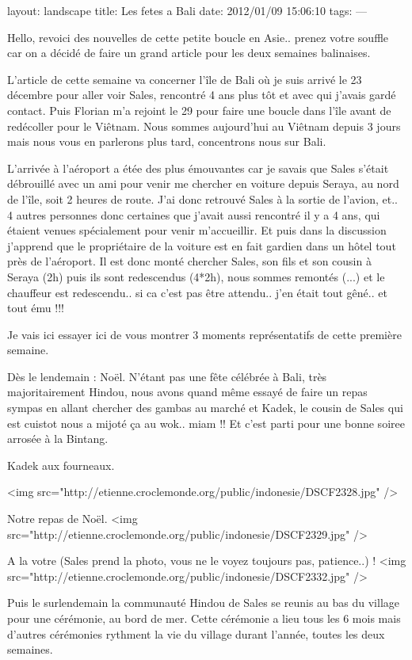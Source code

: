 layout: landscape
title: Les fetes a Bali
date: 2012/01/09 15:06:10
tags:
---

Hello, revoici des nouvelles de cette petite boucle en Asie.. prenez votre souffle car on a décidé de faire un grand article pour les deux semaines balinaises.

L'article de cette semaine va concerner l'île de Bali où je suis arrivé le 23 décembre pour aller voir Sales, rencontré 4 ans plus tôt et avec qui j'avais gardé contact. Puis Florian m'a rejoint le 29 pour faire une boucle dans l'île avant de redécoller pour le Viêtnam. Nous sommes aujourd'hui au Viêtnam depuis 3 jours mais nous vous en parlerons plus tard, concentrons nous sur Bali.

L'arrivée à l'aéroport a étée des plus émouvantes car je savais que Sales s'était débrouillé avec un ami pour venir me chercher en voiture depuis Seraya, au nord de l'île, soit 2 heures de route. J'ai donc retrouvé Sales à la sortie de l'avion, et.. 4 autres personnes donc certaines que j'avait aussi rencontré il y a 4 ans, qui étaient venues spécialement pour venir m'accueillir. Et puis dans la discussion j'apprend que le propriétaire de la voiture est en fait gardien dans un hôtel tout près de l'aéroport. Il est donc monté chercher Sales, son fils et son cousin à Seraya (2h) puis ils sont redescendus (4*2h), nous sommes remontés (...) et le chauffeur est redescendu.. si ca c'est pas être attendu.. j'en était tout gêné.. et tout ému !!!

Je vais ici essayer ici de vous montrer 3 moments représentatifs de cette première semaine.

Dès le lendemain : Noël. N'étant pas une fête célébrée à Bali, très majoritairement Hindou, nous avons quand même essayé de faire un repas sympas en allant chercher des gambas au marché et Kadek, le cousin de Sales qui est cuistot nous a mijoté ça au wok.. miam !! Et c'est parti pour une bonne soiree arrosée à la Bintang.

Kadek aux fourneaux.

<img src="http://etienne.croclemonde.org/public/indonesie/DSCF2328.jpg" />

Notre repas de Noël.
<img src="http://etienne.croclemonde.org/public/indonesie/DSCF2329.jpg" />

A la votre (Sales prend la photo, vous ne le voyez toujours pas, patience..) !
<img src="http://etienne.croclemonde.org/public/indonesie/DSCF2332.jpg" />

Puis le surlendemain la communauté Hindou de Sales se reunis au bas du village pour une cérémonie, au bord de mer. Cette cérémonie a lieu tous les 6 mois mais d'autres cérémonies rythment la vie du village durant l'année, toutes les deux semaines.

